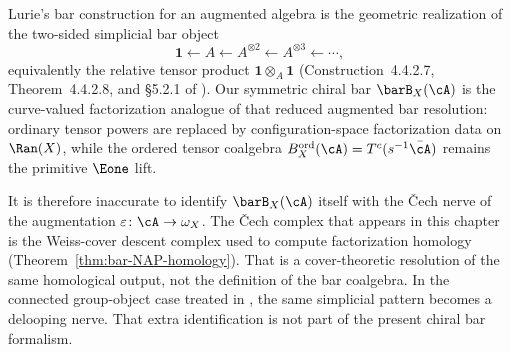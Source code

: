 \begin{remark}
Lurie's bar construction for an augmented algebra is the
geometric realization of the two-sided simplicial bar object
\[
\mathbf{1} \leftarrow A \leftarrow A^{\otimes 2}
\leftarrow A^{\otimes 3} \leftarrow \cdots,
\]
equivalently the relative tensor product
$\mathbf{1}\otimes_A \mathbf{1}$
\textup{(}Construction~4.4.2.7, Theorem~4.4.2.8, and
\S5.2.1 of \cite{HA}\textup{)}.
Our symmetric chiral bar $\barB_X(\cA)$ is the curve-valued
factorization analogue of that reduced augmented bar resolution:
ordinary tensor powers are replaced by configuration-space
factorization data on $\Ran(X)$, while the ordered tensor coalgebra
$B_X^{\mathrm{ord}}(\cA)=T^c(s^{-1}\bar\cA)$ remains the primitive
$\Eone$ lift.

It is therefore inaccurate to identify $\barB_X(\cA)$ itself with the
\v{C}ech nerve of the augmentation
$\varepsilon\colon \cA \to \omega_X$.
The \v{C}ech complex that appears in this chapter is the Weiss-cover
descent complex used to compute factorization homology
\textup{(}Theorem~\textup{\ref{thm:bar-NAP-homology}}\textup{)}.
That is a cover-theoretic resolution of the same homological output,
not the definition of the bar coalgebra.
In the connected group-object case treated in \cite[\S5.2.6]{HA},
the same simplicial pattern becomes a delooping nerve.
That extra identification is not part of the present chiral bar
formalism.
\end{remark}

